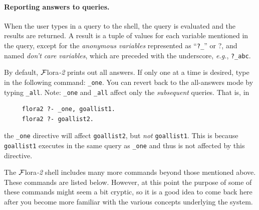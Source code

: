 \documentclass[11pt]{article}
\newcommand{\anon}{?}
\newcommand{\FLORA}{{\mbox{\sc ${\cal F}${lora}\rm\emph{-2}}}\xspace}
\begin{document}
\paragraph{Reporting answers to queries.}
When the user types in a query to the shell, the query is evaluated and the
results are returned. A result is a tuple of values for each variable
mentioned in the query, except for the \emph{anonymous variables}
represented as ``{\tt ?\_}'' or \anon, and named {\em don't care
variables}, which are
preceded with the underscore, {\it e.g.}, {\tt ?\_abc}.

By default, \FLORA prints out all answers. If only one at a time is
desired, type in the following command: {\tt \_one}. You can revert back to
the all-answers mode by typing {\tt \_all}. Note: {\tt \_one} and {\tt \_all}
affect only the \emph{subsequent} queries. That is, in
\begin{verbatim}
     flora2 ?- _one, goallist1.
     flora2 ?- goallist2.
\end{verbatim}
the {\tt \_one} directive will affect {\tt goallist2},
but \emph{not} {\tt goallist1}. This is because {\tt goallist1} executes in
the same query as {\tt \_one} and thus is not affected by this directive.

The \FLORA shell includes many more commands beyond those mentioned above.
These commands are listed below. However, at this point the purpose of some
of these commands might seem a bit cryptic, so it is a good idea to come
back here after you become more familiar with the various concepts
underlying the system.
\end{document}
